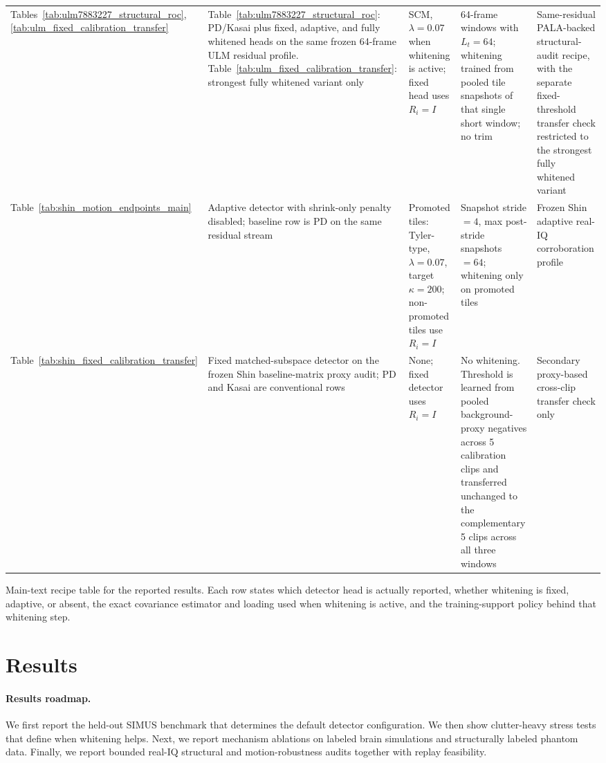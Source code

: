 \documentclass[11pt]{article}
\begin{document}
\begin{center}
\begin{tabular}{@{}P{3.2cm} P{2.8cm} P{4.2cm} P{4.3cm} P{2.9cm}@{}}
Tables~\ref{tab:ulm7883227_structural_roc}, \ref{tab:ulm_fixed_calibration_transfer} & Table~\ref{tab:ulm7883227_structural_roc}: PD/Kasai plus fixed, adaptive, and fully whitened heads on the same frozen 64-frame ULM residual profile. Table~\ref{tab:ulm_fixed_calibration_transfer}: strongest fully whitened variant only & SCM, $\lambda=0.07$ when whitening is active; fixed head uses $R_i=I$ & 64-frame windows with $L_t=64$; whitening trained from pooled tile snapshots of that single short window; no trim & Same-residual PALA-backed structural-audit recipe, with the separate fixed-threshold transfer check restricted to the strongest fully whitened variant \\
Table~\ref{tab:shin_motion_endpoints_main} & Adaptive detector with shrink-only penalty disabled; baseline row is PD on the same residual stream & Promoted tiles: Tyler-type, $\lambda=0.07$, target $\kappa=200$; non-promoted tiles use $R_i=I$ & Snapshot stride $=4$, max post-stride snapshots $=64$; whitening only on promoted tiles & Frozen Shin adaptive real-IQ corroboration profile \\
Table~\ref{tab:shin_fixed_calibration_transfer} & Fixed matched-subspace detector on the frozen Shin baseline-matrix proxy audit; PD and Kasai are conventional rows & None; fixed detector uses $R_i=I$ & No whitening. Threshold is learned from pooled background-proxy negatives across 5 calibration clips and transferred unchanged to the complementary 5 clips across all three windows & Secondary proxy-based cross-clip transfer check only \\
\hline
\end{tabular}
\endgroup
\caption{Main-text recipe table for the reported results. Each row states which detector head is actually reported, whether whitening is fixed, adaptive, or absent, the exact covariance estimator and loading used when whitening is active, and the training-support policy behind that whitening step.}
\label{tab:result_table_score_map}
\end{center}

\section{Results}
\label{sec:results}

\paragraph{Results roadmap.}
We first report the held-out SIMUS benchmark that determines the default detector configuration. We then show clutter-heavy stress tests that define when whitening helps. Next, we report mechanism ablations on labeled brain simulations and structurally labeled phantom data. Finally, we report bounded real-IQ structural and motion-robustness audits together with replay feasibility.
\end{document}
